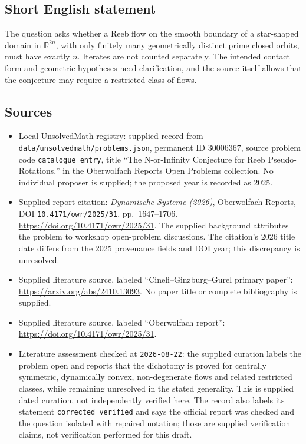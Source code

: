 \documentclass[11pt]{article}
\newcommand{\R}{\mathbb{R}}
\begin{document}
\subsection{Short English statement}
The question asks whether a Reeb flow on the smooth boundary of a star-shaped domain in \(\R^{2n}\), with only finitely many geometrically distinct prime closed orbits, must have exactly \(n\). Iterates are not counted separately. The intended contact form and geometric hypotheses need clarification, and the source itself allows that the conjecture may require a restricted class of flows.
\subsection{Sources}
\begin{itemize}
\item Local UnsolvedMath registry: supplied record from \texttt{data/unsolvedmath/problems.json}, permanent ID \(30006367\), source problem code \texttt{catalogue entry}, title ``The N-or-Infinity Conjecture for Reeb Pseudo-Rotations,'' in the Oberwolfach Reports Open Problems collection. No individual proposer is supplied; the proposed year is recorded as 2025.
\item Supplied report citation: \emph{Dynamische Systeme (2026)}, Oberwolfach Reports, DOI \texttt{10.4171/owr/2025/31}, pp.\ 1647--1706. \url{https://doi.org/10.4171/owr/2025/31}. The supplied background attributes the problem to workshop open-problem discussions. The citation's 2026 title date differs from the 2025 provenance fields and DOI year; this discrepancy is unresolved.
\item Supplied literature source, labeled ``Cineli--Ginzburg--Gurel primary paper'': \url{https://arxiv.org/abs/2410.13093}. No paper title or complete bibliography is supplied.
\item Supplied literature source, labeled ``Oberwolfach report'': \url{https://doi.org/10.4171/owr/2025/31}.
\item Literature assessment checked at \texttt{2026-08-22}: the supplied curation labels the problem open and reports that the dichotomy is proved for centrally symmetric, dynamically convex, non-degenerate flows and related restricted classes, while remaining unresolved in the stated generality. This is supplied dated curation, not independently verified here. The record also labels its statement \texttt{corrected\_verified} and says the official report was checked and the question isolated with repaired notation; those are supplied verification claims, not verification performed for this draft.
\end{itemize}
\end{document}
